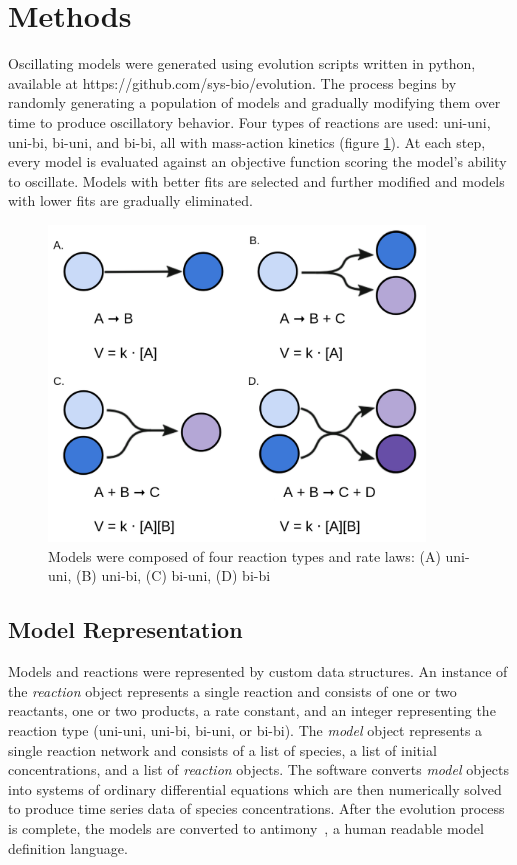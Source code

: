 \documentclass[12pt]{report}
\begin{document}
\section{Methods}



Oscillating models were generated using evolution scripts written in python, available at https://github.com/sys-bio/evolution. The process begins by randomly generating a population of models and gradually modifying them over time to produce oscillatory behavior. Four types of reactions are used: uni-uni, uni-bi, bi-uni, and bi-bi, all with mass-action kinetics (figure \ref{fig:reaction}). At each step, every model is evaluated against an objective function scoring the model's ability to oscillate. Models with better fits are selected and further modified and models with lower fits are gradually eliminated. 
\begin{figure}
    \centering
    \includegraphics[width=10cm]{images/Reactions.png}
    \caption[Types of reactions and their rate laws]{Models were composed of four reaction types and rate laws: (A) uni-uni, (B) uni-bi, (C) bi-uni, (D) bi-bi}
    \label{fig:reaction}
    
\end{figure}





\subsection{Model Representation}

Models and reactions were represented by custom data structures. An instance of the \textit{reaction} object represents a single reaction and consists of one or two reactants, one or two products, a rate constant, and an integer representing the reaction type (uni-uni, uni-bi, bi-uni, or bi-bi). The \textit{model} object represents a single reaction network and consists of a list of species, a list of initial concentrations, and a list of \textit{reaction} objects. The software converts \textit{model} objects into systems of ordinary differential equations which are then numerically solved to produce time series data of species concentrations. After the evolution process is complete, the models are converted to antimony~\cite{Smith2009}, a human readable model definition language.
\end{document}
